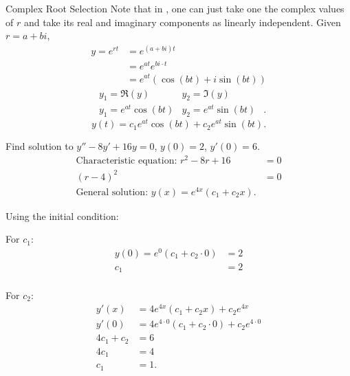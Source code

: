 \documentclass[../notes.tex]{subfiles}
\begin{document}
\begin{stickynote}{Complex Root Selection}
				Note that in , one can just take one the complex values of $r$ and take its real and imaginary components as linearly independent. Given $r = a + bi$,
				 \begin{align*}
								y = e^{rt} &= e^{(a+bi)t} \\
				        &=e^{at} e^{bi\cdot t} \\
								&=e^{at} \left( \cos(bt) + i\sin(bt) \right)
				\end{align*} \begin{align*}
								& y_1 = \Re(y) & y_2 = \Im(y) & \\
								& y_1 = e^{at}\cos(bt) & y_2 = e^{at}\sin(bt) &
				.\end{align*}
				\boldmath\[
								y(t) = c_1 e^{at}\cos(bt) + c_2 e^{at} \sin(bt).
				\] 
\end{stickynote}

\begin{example}{Find solution to $y'' - 8y' + 16y = 0$,  $y(0) = 2$, $y'(0) = 6$.}
 \begin{align*}
				 \text{Characteristic equation: } r^2 - 8r + 16 &= 0 \\
				 (r-4)^2 &= 0 \\
				 \text{General solution: } y(x) = e^{4x} ( c_1 + c_2 x ) 
.\end{align*}

Using the initial condition:

\begin{multicols}{2}
For $c_1$:
\begin{align*}
				y(0) = e^{0} (c_1 + c_2\cdot 0) &= 2 \\
				c_1 &= 2 \\
\end{align*}

\columnbreak

For $c_2$:
\begin{align*}
				y'(x) &= 4e^{4x} (c_1 + c_2 x) + c_2e^{4x} \\
				y'(0) &= 4e^{4 \cdot 0} (c_1 + c_2 \cdot 0) + c_2e^{4\cdot 0} \\
				4 c_1 + c_2 &=6 \\
				4c_1 &= 4 \\
				c_1 &= 1
.\end{align*}
\end{multicols}
\end{example}
\end{document}

